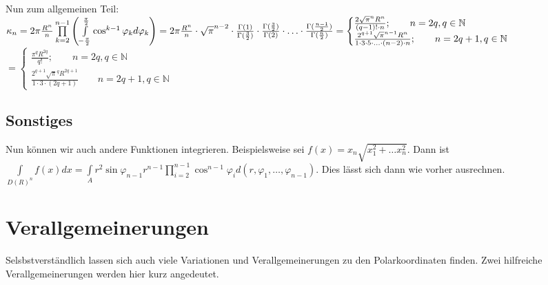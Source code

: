 \documentclass[a4paper,11pt]{scrartcl}
\newcommand{\N}{{\ensuremath{\mathbb{N}}}}
\begin{document}
Nun zum allgemeinen Teil:\\
$\kappa_n=2\pi\frac{R^n}{n}\prod\limits_{k=2}^{n-1}\left(\int\limits_{-\frac{\pi}{2}}^\frac{\pi}{2}\cos^{k-1}\varphi_k d\varphi_k\right)=2\pi\frac{R^n}{n}\cdot\sqrt{\pi}^{n-2}\cdot\frac{\Gamma(1)}{\Gamma(\frac{3}{2})}\cdot\frac{\Gamma(\frac{3}{2})}{\Gamma(2)}\cdot\ldots\cdot\frac{\Gamma(\frac{n-1}{2})}{\Gamma(\frac{n}{2})}
\\=\begin{cases}\frac{2\sqrt{\pi}^n R^n}{(q-1)!\cdot n}; \qquad n=2q, q\in\N \\ \frac{2^{q+1}\sqrt{\pi}^{n-1}R^n}{1\cdot 3\cdot 5\cdot \ldots\cdot(n-2)\cdot n}; \qquad n=2q+1, q\in\N\end{cases}$\\
$=\begin{cases}\frac{\pi^q R^{2q}}{q!}; \qquad n=2q, q\in\N \\ \frac{2^{q+1}\sqrt{\pi}^q R^{2q+1}}{1\cdot 3\cdot (2q+1)} \qquad n=2q+1, q\in\N\end{cases} $
\subsection{Sonstiges}
Nun können wir auch andere Funktionen integrieren. Beispielsweise sei $f(x)=x_n\sqrt{x_1^2+\ldots x_n^2}$. Dann ist $\int\limits_{D(R)^n}f(x)dx=\int\limits_A r^2\sin\varphi_{n-1}r^{n-1}\prod\limits_{i=2}^{n-1}\cos^{n-1}\varphi_i d(r,\varphi_1,\ldots,\varphi_{n-1})$. Dies lässt sich dann wie vorher ausrechnen.
\section{Verallgemeinerungen}
Selsbstverständlich lassen sich auch viele Variationen und Verallgemeinerungen zu den Polarkoordinaten finden. Zwei hilfreiche Verallgemeinerungen werden hier kurz angedeutet.
\end{document}
